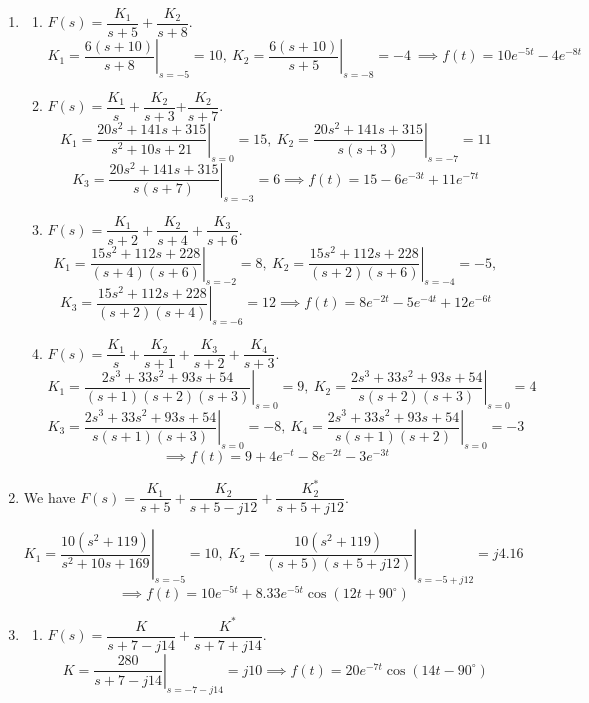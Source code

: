 \documentclass[11pt]{article}
\begin{document}
\begin{enumerate}[leftmargin=*,label=\textbf{2.\arabic*.}]
\item \begin{enumerate}[label=\textbf{\alph*)}]

\item $F(s)=\dfrac{K_1}{s+5}+\dfrac{K_2}{s+8}$.
\[K_1=\left.\dfrac{6(s+10)}{s+8}\right|_{s=-5}=10,\: K_2=\left.\dfrac{6(s+10)}{s+5}\right|_{s=-8}=-4\:\implies \boxed{f(t)=10e^{-5t}-4e^{-8t}}\]

\item $F(s)=\dfrac{K_1}{s}+\dfrac{K_2}{s+3}$+$\dfrac{K_2}{s+7}$.
\[K_1=\left.\dfrac{20s^2+141s+315}{s^2+10s+21}\right|_{s=0}=15,\: K_2=\left.\dfrac{20s^2+141s+315}{s(s+3)}\right|_{s=-7}=11\]
\[K_3=\left.\dfrac{20s^2+141s+315}{s(s+7)}\right|_{s=-3}=6\implies\boxed{f(t)=15-6e^{-3t}+11e^{-7t}}\]

\item $F(s)=\dfrac{K_1}{s+2}+\dfrac{K_2}{s+4}+\dfrac{K_3}{s+6}$.
\[K_1=\left.\dfrac{15s^2+112s+228}{(s+4)(s+6)}\right|_{s=-2}=8,\:K_2=\left.\dfrac{15s^2+112s+228}{(s+2)(s+6)}\right|_{s=-4}=-5,\]
\[K_3=\left.\dfrac{15s^2+112s+228}{(s+2)(s+4)}\right|_{s=-6}=12\implies \boxed{f(t)=8e^{-2t}-5e^{-4t}+12e^{-6t}}\]

\item $F(s)=\dfrac{K_1}{s}+\dfrac{K_2}{s+1}+\dfrac{K_3}{s+2}+\dfrac{K_4}{s+3}.$
\[K_1=\left.\frac{2s^3+33s^2+93s+54}{(s+1)(s+2)(s+3)}\right|_{s=0}=9,\:K_2=\left.\frac{2s^3+33s^2+93s+54}{s(s+2)(s+3)}\right|_{s=0}=4\]
\[K_3=\left.\frac{2s^3+33s^2+93s+54}{s(s+1)(s+3)}\right|_{s=0}=-8,\:K_4=\left.\frac{2s^3+33s^2+93s+54}{s(s+1)(s+2)}\right|_{s=0}=-3\]
\[\implies\boxed{f(t)=9+4e^{-t}-8e^{-2t}-3e^{-3t}}\]

\end{enumerate}

\item We have $F(s)=\dfrac{K_1}{s+5}+\dfrac{K_2}{s+5-j12}+\dfrac{K_2^*}{s+5+j12}$.

\[K_1=\left.\dfrac{10(s^2+119)}{s^2+10s+169}\right|_{s=-5}=10,\:K_2=\left.\dfrac{10(s^2+119)}{(s+5)(s+5+j12)}\right|_{s=-5+j12}=j4.16\]
\[\implies \boxed{f(t)=10e^{-5t}+8.33e^{-5t}\cos(12t+90^\circ)}\]


\item \begin{enumerate}[label=\textbf{\alph*)}]

\item $F(s)=\dfrac{K}{s+7-j14}+\dfrac{K^*}{s+7+j14}$.
\[K=\left.\dfrac{280}{s+7-j14}\right|_{s=-7-j14}=j10\implies \boxed{f(t)=20e^{-7t}\cos(14t-90^\circ)}\]


\end{enumerate}
\end{enumerate}
\end{document}
